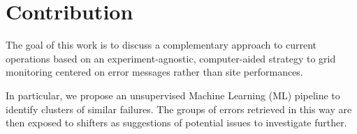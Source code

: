 \section{Contribution}
The goal of this work is to discuss a complementary approach to current operations based on an experiment-agnostic, computer-aided strategy to grid monitoring centered on error messages rather than site performances.

In particular, we propose an unsupervised Machine Learning (ML) pipeline to identify clusters of similar failures. The groups of errors retrieved in this way are then exposed to shifters as suggestions of potential issues to investigate further.
